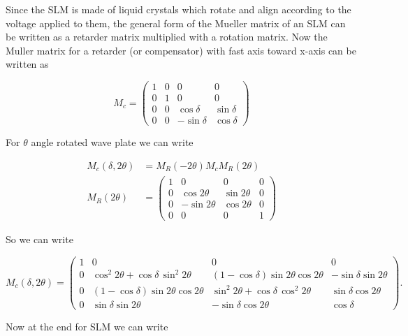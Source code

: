 Since the SLM is made of liquid crystals which rotate and align according to the voltage applied to them, the general form of the Mueller matrix of an SLM can be written as a retarder matrix multiplied with a rotation matrix. Now the Muller matrix for a retarder (or compensator) with fast axis toward x-axis can be written as 

\begin{equation}
M_c =
\begin{pmatrix}
1 & 0 & 0 & 0 \\
0 & 1 & 0 & 0 \\
0 & 0 & \cos\delta & \sin\delta \\
0 & 0 & -\sin\delta & \cos\delta
\end{pmatrix}
\end{equation}

For $\theta$ angle rotated wave plate we can write 

\begin{subequations}
    \begin{align}
        M_c(\delta,2\theta) &= M_R(-2\theta)M_cM_R(2\theta) \\ 
        M_R(2\theta) &=
        \begin{pmatrix}
        1 & 0 & 0 & 0 \\
        0 & \cos 2\theta & \sin 2\theta & 0 \\
        0 & -\sin 2\theta & \cos 2\theta & 0 \\
        0 & 0 & 0 & 1
        \end{pmatrix}
    \end{align}
\end{subequations}

So we can write 

\begin{equation}
    M_c(\delta,2\theta)=
    \begin{pmatrix}
    1 & 0 & 0 & 0 \\
    0 & \cos^2 2\theta + \cos\delta\,\sin^2 2\theta &
    (1-\cos\delta)\sin 2\theta \cos 2\theta &
    -\sin\delta \sin 2\theta \\
    0 & (1-\cos\delta)\sin 2\theta \cos 2\theta &
    \sin^2 2\theta + \cos\delta\,\cos^2 2\theta &
    \sin\delta \cos 2\theta \\
    0 & \sin\delta \sin 2\theta &
    -\sin\delta \cos 2\theta &
    \cos\delta
    \end{pmatrix}.
\end{equation}

Now at the end for SLM we can write 

